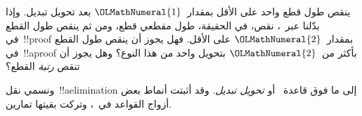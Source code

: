 \documentclass[../../../include/open-logic-section]{subfiles}
\begin{document}
\begin{prob}
ينقص طول قطع واحد على الأقل بمقدار~${\OLMathNumeral{1}}$ بعد تحويل تبديل. وإذا بدّلنا
\Elim{\land} عبر~\Elim{\lor}، نقص، في الحقيقة، طول مقطعي قطع، ومن ثم
ينقص طول القطع في~!!{proof} بمقدار~${\OLMathNumeral{2}}$ على الأقل. فهل يجوز أن ينقص طول
القطع في~!!a{proof} بأكثر من~${\OLMathNumeral{2}}$ بتحويل واحد من هذا النوع؟ وهل يجوز أن
تنقص \emph{رتبة} القطع؟
\end{prob}

ونسمي نقل~!!a{elimination} إلى ما فوق قاعدة~\Elim{\lor} أو
\Elim{\lexists} \emph{تحويل تبديل}. وقد أثبتت أنماط بعض أزواج القواعد
في~، وتركت بقيتها تمارين.

\end{document}
